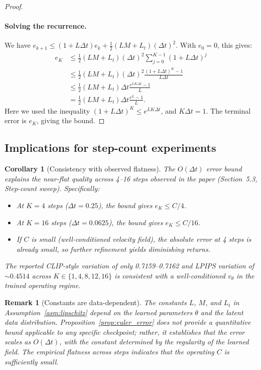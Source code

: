 \documentclass[letterpaper]{article}
\newtheorem{corollary}[proposition]{Corollary}
\newtheorem{remark}[proposition]{Remark}
\begin{document}
\begin{proof}
\paragraph{Solving the recurrence.}
We have $e_{k+1} \leq (1 + L \Delta t) e_k + \frac{1}{2} (L M + L_t) (\Delta t)^2$.
With $e_0 = 0$, this gives:
\begin{align}
    e_K &\leq \frac{1}{2} (L M + L_t) (\Delta t)^2 \sum_{j=0}^{K-1} (1 + L \Delta t)^j \\
    &\leq \frac{1}{2} (L M + L_t) (\Delta t)^2 \frac{(1 + L \Delta t)^K - 1}{L \Delta t} \\
    &\leq \frac{1}{2} (L M + L_t) \Delta t \frac{e^{L K \Delta t} - 1}{L} \\
    &= \frac{1}{2} (L M + L_t) \Delta t \frac{e^L - 1}{L} .
\end{align}
Here we used the inequality $(1 + L\Delta t)^K \leq e^{L K \Delta t}$,
and $K \Delta t = 1$. The terminal error is $e_K$, giving the bound.
\end{proof}

\subsection{Implications for step-count experiments}

\begin{corollary}[Consistency with observed flatness]
\label{cor:step_flatness}
The $O(\Delta t)$ error bound explains the near-flat quality across
4--16 steps observed in the paper (Section~5.3, Step-count sweep).
Specifically:
\begin{itemize}
    \item At $K = 4$ steps ($\Delta t = 0.25$), the bound gives
    $e_K \leq C / 4$.
    \item At $K = 16$ steps ($\Delta t = 0.0625$), the bound gives
    $e_K \leq C / 16$.
    \item If $C$ is small (well-conditioned velocity field), the absolute
    error at 4 steps is already small, so further refinement yields
    diminishing returns.
\end{itemize}
The reported CLIP-style variation of only 0.7159--0.7162 and LPIPS
variation of $\sim 0.4514$ across $K \in \{1, 4, 8, 12, 16\}$ is
consistent with a well-conditioned $v_\theta$ in the trained operating
regime.
\end{corollary}

\begin{remark}[Constants are data-dependent]
The constants $L$, $M$, and $L_t$ in Assumption~\ref{asm:lipschitz} depend
on the learned parameters $\theta$ and the latent data distribution.
Proposition~\ref{prop:euler_error} does not provide a quantitative bound
applicable to any specific checkpoint; rather, it establishes that the
error scales as $O(\Delta t)$, with the constant determined by the
regularity of the learned field. The empirical flatness across steps
indicates that the operating $C$ is sufficiently small.
\end{remark}
\end{document}
